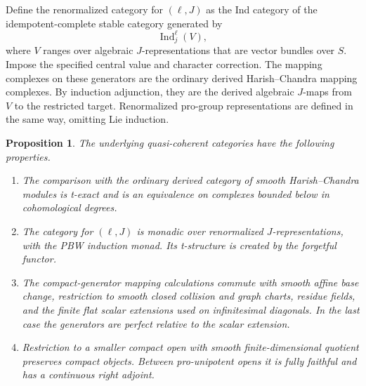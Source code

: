 \documentclass[11pt]{article}
\numberwithin{equation}{section}
\newtheorem{proposition}[theorem]{Proposition}
\theoremstyle{definition}
\theoremstyle{remark}
\begin{document}
Define the renormalized category for $(\ell,J)$ as the Ind category
of the idempotent-complete stable category generated by
\begin{equation}\label{eq:L2}
                       \operatorname{Ind}_{j}^{\ell}(V),
\end{equation}
where $V$ ranges over algebraic $J$-representations that are vector
bundles over $S$.  Impose the specified central value and character
correction.  The mapping complexes on these generators are the
ordinary derived Harish--Chandra mapping complexes.  By induction
adjunction, they are the derived algebraic $J$-maps from $V$ to the
restricted target.  Renormalized pro-group representations are defined
in the same way, omitting Lie induction.

\begin{proposition}\label{loop:hc-renormalization}
The underlying quasi-coherent categories have the following properties.
\begin{enumerate}
\item The comparison with the ordinary derived category of smooth
Harish--Chandra modules is t-exact and is an equivalence on complexes
bounded below in cohomological degrees.
\item The category for $(\ell,J)$ is monadic over renormalized
$J$-representations, with the PBW induction monad.  Its t-structure is
created by the forgetful functor.
\item The compact-generator mapping calculations commute with smooth
affine base change, restriction to smooth closed collision and graph
charts, residue fields, and the finite flat scalar
extensions used on infinitesimal diagonals.  In the last case the
generators are perfect relative to the scalar extension.
\item Restriction to a smaller compact open with smooth finite-dimensional
quotient preserves compact objects.  Between pro-unipotent opens it
is fully faithful and has a continuous right adjoint.
\end{enumerate}
\end{proposition}
\end{document}
